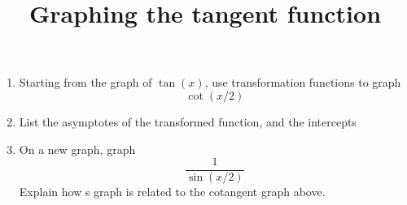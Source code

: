 \documentclass[a4paper,12pt]{article}
\begin{document}
\title {Graphing the tangent function}
\maketitle
		



\begin{enumerate}
	\item{Starting from the graph of $\tan(x)$, use transformation functions to graph \newline $$\cot(x/2)$$} 
	\item{List the asymptotes of the transformed function, and the intercepts}
		\item{On a new graph, graph $$\frac{1}{\sin(x/2)}$$ Explain how s graph is related to the cotangent graph above. }

\end{enumerate}
\end{document}
